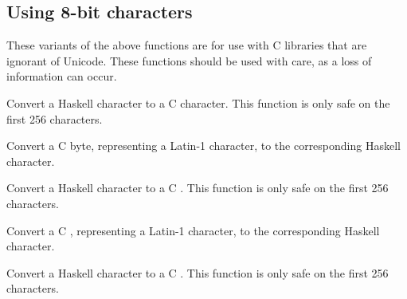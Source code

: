 \subsection{Using 8-bit characters}
These variants of the above functions are for use with C libraries that
 are ignorant of Unicode. These functions should be used with care, as a
 loss of information can occur.\par
\begin{haddockdesc}
\item[\begin{tabular}{@{}l}
castCharToCChar :: Char -> CChar
\end{tabular}]
{\haddockbegindoc
Convert a Haskell character to a C character.
 This function is only safe on the first 256 characters.\par}
\end{haddockdesc}
\begin{haddockdesc}
\item[\begin{tabular}{@{}l}
castCCharToChar :: CChar -> Char
\end{tabular}]
{\haddockbegindoc
Convert a C byte, representing a Latin-1 character, to the corresponding
 Haskell character.\par}
\end{haddockdesc}
\begin{haddockdesc}
\item[\begin{tabular}{@{}l}
castCharToCUChar :: Char -> CUChar
\end{tabular}]
{\haddockbegindoc
Convert a Haskell character to a C .
 This function is only safe on the first 256 characters.\par}
\end{haddockdesc}
\begin{haddockdesc}
\item[\begin{tabular}{@{}l}
castCUCharToChar :: CUChar -> Char
\end{tabular}]
{\haddockbegindoc
Convert a C , representing a Latin-1 character, to
 the corresponding Haskell character.\par}
\end{haddockdesc}
\begin{haddockdesc}
\item[\begin{tabular}{@{}l}
castCharToCSChar :: Char -> CSChar
\end{tabular}]
{\haddockbegindoc
Convert a Haskell character to a C .
 This function is only safe on the first 256 characters.\par}
\end{haddockdesc}
